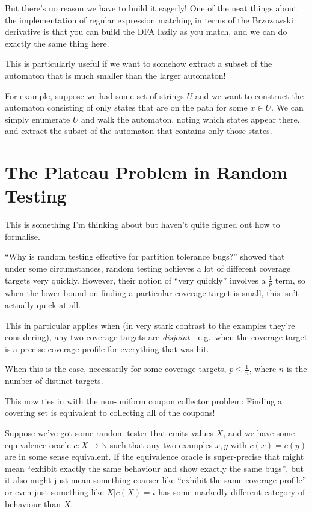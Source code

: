 \documentclass[a4paper]{book}
\begin{document}
But there's no reason we have to build it eagerly!
One of the neat things about the implementation of regular expression matching in terms of the Brzozowski derivative is that you can build the DFA lazily as you match,
and we can do exactly the same thing here.

This is particularly useful if we want to somehow extract a subset of the automaton that is much smaller than the larger automaton!

For example,
suppose we had some set of strings \(U\) and we want to construct the automaton consisting of only states that are on the path for some \(x \in U\).
We can simply enumerate \(U\) and walk the automaton,
noting which states appear there,
and extract the subset of the automaton that contains only those states.

\chapter{The Plateau Problem in Random Testing}

This is something I'm thinking about but haven't quite figured out how to formalise.

``Why is random testing effective for partition tolerance bugs?''\cite{DBLP:journals/pacmpl/MajumdarN18} showed that under some circumstances,
random testing achieves a lot of different coverage targets very quickly.
However, their notion of ``very quickly'' involves a \(\frac{1}{p}\) term,
so when the lower bound on finding a particular coverage target is small,
this isn't actually quick at all.

This in particular applies when (in very stark contrast to the examples they're considering),
any two coverage targets are \emph{disjoint}---e.g.\ 
when the coverage target is a precise coverage profile for everything that was hit.

When this is the case,
necessarily for some coverage targets, \(p \leq \frac{1}{n}\),
where \(n\) is the number of distinct targets.

This now ties in with the non-uniform coupon collector problem:
Finding a covering set is equivalent to collecting all of the coupons!

Suppose we've got some random tester that emits values \(X\),
and we have some equivalence oracle \(c: X \to \mathbb{N}\) such that any two examples \(x, y\) with \(c(x) = c(y)\) are in some sense equivalent.
If the equivalence oracle is super-precise that might mean ``exhibit exactly the same behaviour and show exactly the same bugs'',
but it also might just mean something coarser like ``exhibit the same coverage profile'' or even just something like \(X|c(X) = i\) has some markedly different category of behaviour than \(X\).
\end{document}
